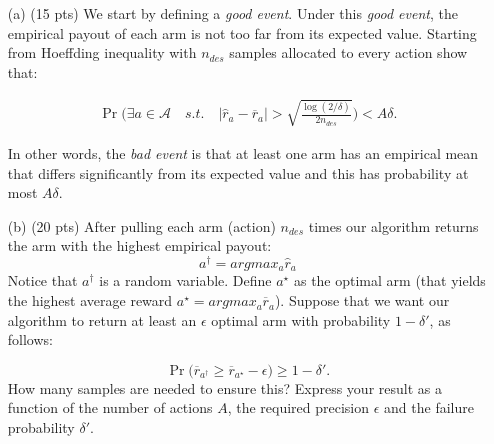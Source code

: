 \documentclass{article}
\begin{document}
\begin{enumerate}

\item[(a) (15 pts)] We start by defining a \emph{good event}. Under this \emph{good event}, the empirical payout of each arm is not too far from its expected value. Starting from Hoeffding inequality with $n_{des}$ samples allocated to every action show that:

\begin{align*}
\Pr\Bigg(\exists a \in \mathcal A \quad s.t. \quad |\widehat r_a - \overline r_a | > \sqrt{\frac{\log(2/\delta)}{2n_{des}}}	\Bigg) < A\delta.
\end{align*}

In other words, the \emph{bad event} is that at least one arm has an empirical mean that differs significantly from its expected value and this has probability at most $A\delta$.

\item[(b) (20 pts)] After pulling each arm (action) $n_{des}$ times our algorithm returns the arm with the highest empirical payout:
\begin{equation*}
a^\dagger = argmax_{a} \widehat r_a	
\end{equation*}
Notice that $a^\dagger$ is a random variable.
 Define ${a^\star}$ as the optimal arm (that yields the highest average reward ${a^\star} = argmax_a \overline r_{a}$). Suppose that we want our algorithm to return at least an $\epsilon$ optimal arm with probability $1-\delta'$, as follows:

\begin{equation*}
	\Pr \Bigg(\overline r_{a^\dagger} \geq  \overline r_{a^\star} - \epsilon \Bigg) \geq 1-\delta'.
\end{equation*}
How many samples are needed to ensure this? Express your result as a function of the number of actions $A$, the required precision $\epsilon$ and the failure probability $\delta'$.

\end{enumerate}

\printbibliography
\end{document}
